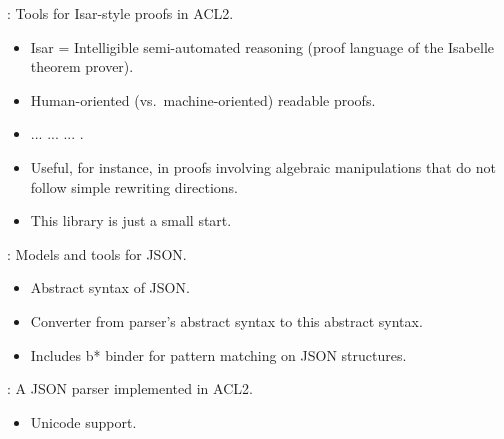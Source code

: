 
\begin{frame}

\newlibtitle

:
Tools for Isar-style proofs in ACL2.
\begin{itemize}
\item Isar = Intelligible semi-automated reasoning
      (proof language of the Isabelle theorem prover).
\item Human-oriented (vs.\ machine-oriented) readable proofs.
\item {} ...  ...  ... .
\item Useful, for instance, in proofs involving algebraic manipulations
      that do not follow simple rewriting directions.
\item This library is just a small start.
\end{itemize}

\end{frame}


\begin{frame}

\newlibtitle

:
Models and tools for JSON.
\begin{itemize}
\item Abstract syntax of JSON.
\item Converter from parser's abstract syntax to this abstract syntax.
\item Includes b* binder for pattern matching on JSON structures.
\end{itemize}

\end{frame}


\begin{frame}

\newlibtitle

:
A JSON parser implemented in ACL2.
\begin{itemize}
\item Unicode support.
\end{itemize}

\end{frame}

